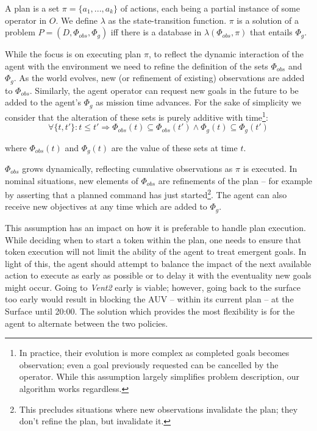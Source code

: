 \begin{definition}
  \label{def:plan}
  A plan is a set $\pi = \{a_1,...,a_k\}$ of actions, each being a
  partial instance of some operator in $O$.  We define $\lambda$ as
  the state-transition function.  $\pi$ is a solution of a problem $P
  = (D, \Phi_{obs}, \Phi_g)$ iff there is a database in $\lambda(\Phi_{obs},
  \pi)$ that entails $\Phi_g$.
\end{definition}
 
While the focus is on executing plan $\pi$, to reflect the dynamic
interaction of the agent with the environment we need to refine the
definition of the sets $\Phi_{obs}$ and $\Phi_g$. As the world
evolves, new (or refinement of existing) observations are added to
$\Phi_{obs}$. Similarly, the agent operator can request new goals in
the future to be added to the agent's $\Phi_g$ as mission time
advances. For the sake of simplicity we consider that the alteration
of these sets is purely additive with time\footnote{In practice, their
  evolution is more complex as completed goals becomes observation;
  even a goal previously requested can be cancelled by the
  operator. While this assumption largely simplifies problem
  description, our algorithm works regardless.}:
\[ \forall \{t, t'\}: t \le t' \Rightarrow \Phi_{obs}(t) \subseteq \Phi_{obs}(t')
\wedge \Phi_g(t) \subseteq \Phi_g(t') \] 

where $\Phi_{obs}(t)$ and $\Phi_g(t)$ are the value of these sets at
time $t$.

$\Phi_{obs}$ grows dynamically, reflecting cumulative observations as
$\pi$ is executed. In nominal situations, new elements of $\Phi_{obs}$
are refinements of the plan -- for example by asserting that a planned
command has just started\footnote{This precludes situations where new
  observations invalidate the plan; they don't refine the plan, but
  invalidate it.}. The agent can also receive new objectives at any
time which are added to $\Phi_g$. 

This assumption has an impact on how it is preferable to handle plan
execution. While deciding when to start a token within the plan, one
needs to ensure that token execution will not limit the ability of the
agent to treat emergent goals. In light of this, the agent should
attempt to balance the impact of the next available action to execute
as early as possible or to delay it with the eventuality new goals
might occur. Going to \emph{Vent2} early is viable; however, going
back to the surface too early would result in blocking the AUV --
within its current plan -- at the Surface until 20:00. The solution
which provides the most flexibility is for the agent to alternate
between the two policies.

